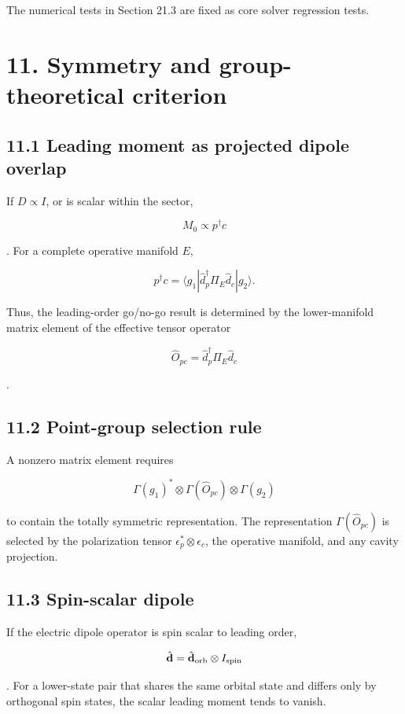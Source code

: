 \documentclass[
  10pt,
  a4paper,
]{article}
\begin{document}
The numerical tests in Section 21.3 are fixed as core solver regression
tests.

\section{11. Symmetry and group-theoretical
criterion}\label{symmetry-and-group-theoretical-criterion}

\subsection{11.1 Leading moment as projected dipole
overlap}\label{leading-moment-as-projected-dipole-overlap}

If \(D\propto I\), or is scalar within the sector,

\[
M_0\propto p^\dagger c
\]

. For a complete operative manifold \(E\),

\[
p^\dagger c
=\langle g_1|
\hat d_p^\dagger\Pi_E\hat d_c
|g_2\rangle.
\]

Thus, the leading-order go/no-go result is determined by the
lower-manifold matrix element of the effective tensor operator

\[
\hat O_{pc}=\hat d_p^\dagger\Pi_E\hat d_c
\]

.

\subsection{11.2 Point-group selection
rule}\label{point-group-selection-rule}

A nonzero matrix element requires

\[
\Gamma(g_1)^*\otimes
\Gamma(\hat O_{pc})\otimes
\Gamma(g_2)
\]

to contain the totally symmetric representation. The representation
\(\Gamma(\hat O_{pc})\) is selected by the polarization tensor
\(\epsilon_p^*\otimes\epsilon_c\), the operative manifold, and any
cavity projection.

\subsection{11.3 Spin-scalar dipole}\label{spin-scalar-dipole}

If the electric dipole operator is spin scalar to leading order,

\[
\hat{\mathbf d}=\hat{\mathbf d}_{\rm orb}\otimes I_{\rm spin}
\]

. For a lower-state pair that shares the same orbital state and differs
only by orthogonal spin states, the scalar leading moment tends to
vanish.
\end{document}
